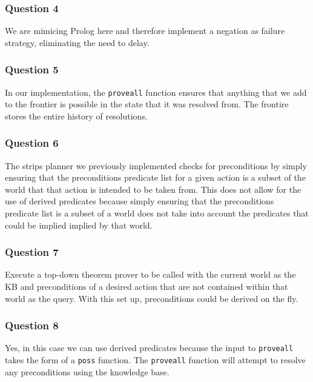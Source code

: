 \documentclass[11pt]{article}
\begin{document}
    \hypertarget{question-4}{%
\subsubsection{Question 4}\label{question-4}}

We are mimicing Prolog here and therefore implement a negation as
failure strategy, eliminating the need to delay.

    \hypertarget{question-5}{%
\subsubsection{Question 5}\label{question-5}}

In our implementation, the \texttt{proveall} function ensures that
anything that we add to the frontier is possible in the state that it
was resolved from. The frontire stores the entire history of
resolutions.

    \hypertarget{question-6}{%
\subsubsection{Question 6}\label{question-6}}

The strips planner we previously implemented checks for preconditions by
simply ensuring that the preconditions predicate list for a given action
is a subset of the world that that action is intended to be taken from.
This does not allow for the use of derived predicates because simply
ensuring that the preconditions predicate list is a subset of a world
does not take into account the predicates that could be implied implied
by that world.

    \hypertarget{question-7}{%
\subsubsection{Question 7}\label{question-7}}

Execute a top-down theorem prover to be called with the current world as
the KB and preconditions of a desired action that are not contained
within that world as the query. With this set up, preconditions could be
derived on the fly.

    \hypertarget{question-8}{%
\subsubsection{Question 8}\label{question-8}}

Yes, in this case we can use derived predicates because the input to
\texttt{proveall} takes the form of a \texttt{poss} function. The
\texttt{proveall} function will attempt to resolve any preconditions
using the knowledge base.
\end{document}
